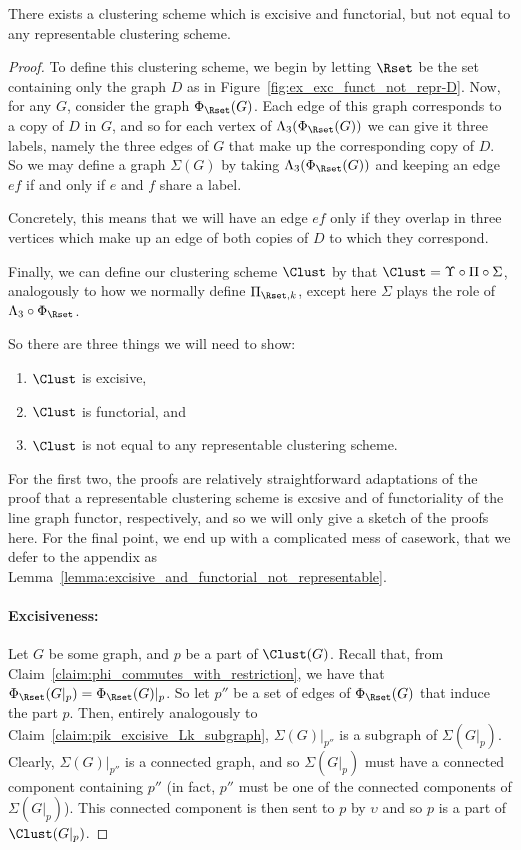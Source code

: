 \documentclass[a4paper,reqno,oneside]{article} %
\begin{document}
\begin{lemma}\label{lemma:exists_exc_and_funct_not_representable}
    There exists a clustering scheme which is excisive and functorial, but not equal to any representable clustering scheme. 
\end{lemma}
\begin{proof}
    To define this clustering scheme, we begin by letting $\Rset$ be the set containing only the graph $D$ as in Figure~\ref{fig:ex_exc_funct_not_repr-D}. Now, for any $G$, consider the graph $\Phi_\Rset(G)$. Each edge of this graph corresponds to a copy of $D$ in $G$, and so for each vertex of $\Lambda_3(\Phi_\Rset(G))$ we can give it three labels, namely the three edges of $G$ that make up the corresponding copy of $D$. So we may define a graph $\Sigma(G)$ by taking $\Lambda_3(\Phi_\Rset(G))$ and keeping an edge $ef$ if and only if $e$ and $f$ share a label.

    Concretely, this means that we will have an edge $ef$ only if they overlap in three vertices which make up an edge of both copies of $D$ to which they correspond.

    Finally, we can define our clustering scheme $\Clust$ by that $\Clust = \Upsilon\circ\Pi\circ\Sigma$, analogously to how we normally define $\Pi_{\Rset,k}$, except here $\Sigma$ plays the role of $\Lambda_3\circ\Phi_\Rset$.
    
    So there are three things we will need to show:
    \begin{enumerate}
        \item $\Clust$ is excisive,
        \item $\Clust$ is functorial, and
        \item $\Clust$ is not equal to any representable clustering scheme.
    \end{enumerate}
    For the first two, the proofs are relatively straightforward adaptations of the proof that a representable clustering scheme is excsive and of functoriality of the line graph functor, respectively, and so we will only give a sketch of the proofs here. For the final point, we end up with a complicated mess of casework, that we defer to the appendix as Lemma~\ref{lemma:excisive_and_functorial_not_representable}.

    \paragraph*{Excisiveness:} Let $G$ be some graph, and $p$ be a part of $\Clust(G)$. Recall that, from Claim~\ref{claim:phi_commutes_with_restriction}, we have that $\Phi_\Rset(G|_p) = \Phi_\Rset(G)|_p$. So let $p''$ be a set of edges of $\Phi_\Rset(G)$ that induce the part $p$. Then, entirely analogously to Claim~\ref{claim:pik_excisive_Lk_subgraph}, $\Sigma(G)|_{p''}$ is a subgraph of $\Sigma(G|_p)$. Clearly, $\Sigma(G)|_{p''}$ is a connected graph, and so $\Sigma(G|_p)$ must have a connected component containing $p''$ (in fact, $p''$ must be one of the connected components of $\Sigma(G|_p)$). This connected component is then sent to $p$ by $\upsilon$ and so $p$ is a part of $\Clust(G|_p)$.


\end{proof}
\end{document}

